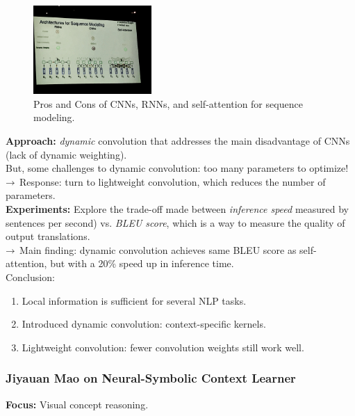 \begin{figure}[h!]
    \centering
    \includegraphics[width=0.4\textwidth]{images/cnn_rnn-2.JPG}
    \caption{Pros and Cons of CNNs, RNNs, and self-attention for sequence modeling.}
    \label{fig:cnn_rnn}
\end{figure}

{\bf Approach:} {\it dynamic} convolution that addresses the main disadvantage of CNNs (lack of dynamic weighting). \\

But, some challenges to dynamic convolution: too many parameters to optimize! \\

$\rightarrow$ Response: turn to lightweight convolution, which reduces the number of parameters. \\

{\bf Experiments:} Explore the trade-off made between {\it inference speed} measured by sentences per second) vs. {\it BLEU score}, which is a way to measure the quality of output translations. \\

$\rightarrow$ Main finding: dynamic convolution achieves same BLEU score as self-attention, but with a 20\% speed up in inference time. \\

Conclusion:
\begin{enumerate}
    \item Local information is sufficient for several NLP tasks.
    \item Introduced dynamic convolution: context-specific kernels.
    \item Lightweight convolution: fewer convolution weights still work well.
\end{enumerate}


\subsubsection{Jiyauan Mao on Neural-Symbolic Context Learner~\cite{mao2019neuro}}

{\bf Focus:} Visual concept reasoning. \\

